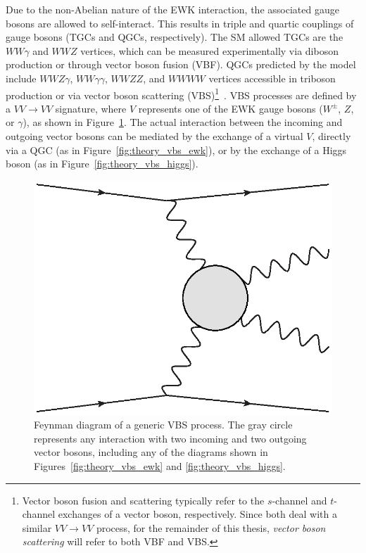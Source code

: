 Due to the non-Abelian nature of the EWK interaction, the associated gauge bosons are allowed to self-interact.
This results in triple and quartic couplings of gauge bosons (TGCs and QGCs, respectively).
The SM allowed TGCs are the $WW\gamma$ and $WWZ$ vertices, which can be measured experimentally via diboson production or through vector boson fusion (VBF).
QGCs predicted by the model include $WWZ\gamma$, $WW\gamma\gamma$, $WWZZ$, and $WWWW$ vertices accessible in triboson production or via vector boson scattering (VBS)\footnote{Vector boson fusion and scattering typically refer to the $s$-channel and $t$-channel exchanges of a vector boson, respectively.  Since both deal with a similar $VV\rightarrow VV$ process, for the remainder of this thesis, \emph{vector boson scattering} will refer to both VBF and VBS.}~\cite{2017.multiboson-at-lhc}.
VBS processes are defined by a $VV\rightarrow VV$ signature, where $V$ represents one of the EWK gauge bosons ($W^{\pm}$, $Z$, or $\gamma$), as shown in Figure~\ref{fig:theory_generic_vbs}.
The actual interaction between the incoming and outgoing vector bosons can be mediated by the exchange of a virtual $V$, directly via a QGC (as in Figure~\ref{fig:theory_vbs_ewk}), or by the exchange of a Higgs boson (as in Figure~\ref{fig:theory_vbs_higgs}).

\begin{figure}[htbp]
  \centering
  \includegraphics[width=.4\textwidth]{figs/theory/generic_vbs}
  \caption{Feynman diagram of a generic VBS process.  The gray circle represents any interaction with two incoming and two outgoing vector bosons, including any of the diagrams shown in Figures~\ref{fig:theory_vbs_ewk} and \ref{fig:theory_vbs_higgs}.}
  \label{fig:theory_generic_vbs}
\end{figure}


